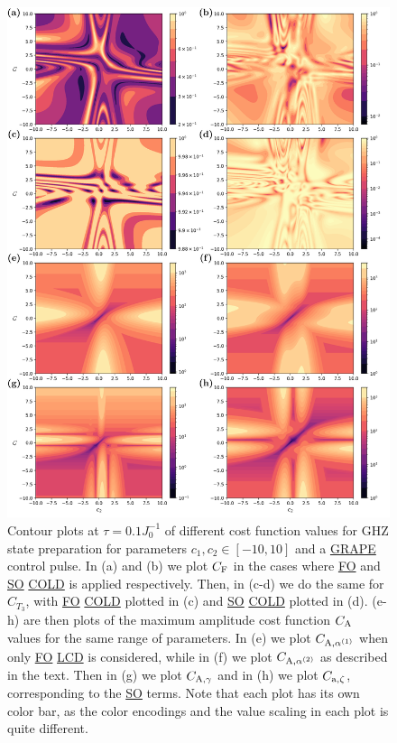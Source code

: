 \documentclass[a4paper,oneside,11pt]{book}
\newcommand{\acrref}[1]{\hyperref[acr:#1]{#1}}
\begin{document}
\begin{figure}[t!]
    \centering
    \includegraphics[width=0.8\linewidth]{images/ghz_contour_maximums.png} \caption[Contour plots of cost function landscapes for GHZ state preparation in frustrated spin systems (maximum amplitude cost function).]{Contour plots at $\tau = 0.1 J_0^{-1}$ of different cost function values for GHZ state preparation for parameters $c_1, c_2 \in [-10,10]$ and a \acrref{GRAPE} control pulse. In (a) and (b) we plot $C_{\rm F}$ in the cases where \acrref{FO} and \acrref{SO} \acrref{COLD} is applied respectively. Then, in (c-d) we do the same for $C_{T_3}$, with \acrref{FO} \acrref{COLD} plotted in (c) and \acrref{SO} \acrref{COLD} plotted in (d). (e-h) are then plots of the maximum amplitude cost function $C_{\rm A}$ values for the same range of parameters. In (e) we plot $C_{\rm A, \alpha^{(1)}}$ when only \acrref{FO} \acrref{LCD} is considered, while in (f) we plot $C_{\rm A, \alpha^{(2)}}$ as described in the text. Then in (g) we plot $C_{\rm A, \gamma}$ and in (h) we plot $C_{\rm a, \zeta}$, corresponding to the \acrref{SO} terms. Note that each plot has its own color bar, as the color encodings and the value scaling in each plot is quite different.} \label{fig:ghz_contours_max_appendix}
\end{figure}
\end{document}
